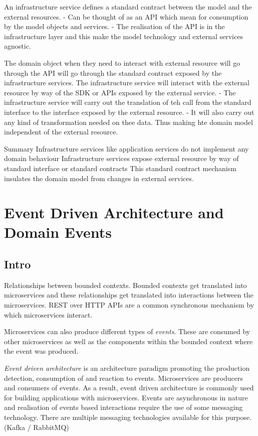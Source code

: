 \documentclass[a4paper, 11pt]{book}
\begin{document}
    An infrastructure service defines a standard contract between the model and the external resources.
    - Can be thought of as an API which mean for consumption by the model objects and services.
    - The realisation of the API is in the infrastructure layer and this make the model technology and external services agnostic.

    The domain object when they need to interact with external resource will go through the API will go through the standard contract exposed by the infrastructure services.
    The infrastructure service will interact with the external resource by way of the SDK or APIs exposed by the external service.
    - The infrastructure service will carry out the translation of teh call from the standard interface to the interface exposed by the external resource.
    - It will also carry out any kind of transformation needed on thee data.
    Thus making hte domain model independent of the external resource.

    Summary
    Infrastructure services like application services do not implement any domain behaviour
    Infrastructure services expose external resource by way of standard interface or standard contracts
    This standard contract mechanism insulates the domain model from changes in external services.



    \chapter{Event Driven Architecture and Domain Events}


    \section{Intro}
    Relationships between bounded contexts.
    Bounded contexts get translated into microservices and these relationships get translated into interactions between the microservices.
    REST over HTTP APIs are a common synchronous mechanism by which microservices interact.

    Microservices can also produce different types of \textit{events}.
    These are consumed by other microservices as well as the components within the bounded context where the event was produced.

    \textit{Event driven architecture} is an architecture paradigm promoting the production detection, consumption of and reaction to events.
    Microservices are producers and consumers of events.
    As a result, event driven architecture is commonly used for building applications with microservices.
    Events are asynchronous in nature and realisation of events based interactions require the use of some messaging technology.
    There are multiple messaging technologies available for this purpose. (Kafka / RabbitMQ)
\end{document}

